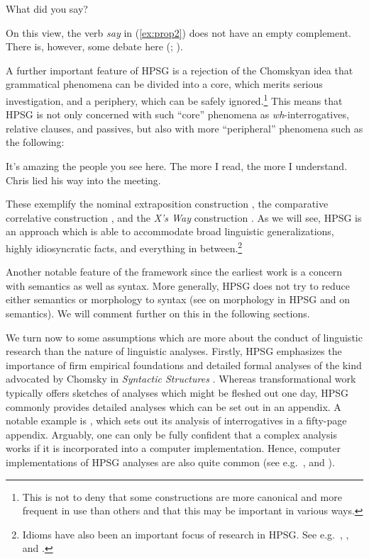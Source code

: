 \documentclass[output=paper
	        ,collection
	        ,collectionchapter
 	        ,biblatex
                ,babelshorthands
                ,newtxmath
                ,draftmode
                ,colorlinks, citecolor=brown
]{langscibook}
\begin{document}
\ea\label{ex:prop2}
What did you say?
\z

\noindent
On this view, the verb \emph{say} in (\ref{ex:prop2}) does not have an empty complement. There is,
however, some debate here (\citealp{SF94a,Mueller2004e};
).

A further important feature of HPSG is a rejection of the Chomskyan idea that grammatical phenomena can be divided into a core, which merits serious investigation, and a periphery, which can be safely ignored.\footnote{%
  This is not to deny that some constructions are more canonical and more frequent in use than others and that this may be important in various ways.}
%
This means that HPSG is not only concerned with such ``core'' phenomena as \emph{wh}-interrogatives, relative clauses, and passives, but also with more ``peripheral'' phenomena such as the following:


\eal\label{ex:prop3}
\ex\label{ex:prop3a}
It’s amazing the people you see here.
\ex\label{ex:prop3b}
The more I read, the more I understand.
\ex\label{ex:prop3c}
Chris lied his way into the meeting.
\zl

\noindent
These exemplify the nominal extraposition construction \citep{ML96a}, the comparative correlative construction \citep{Abeille2006a,AB2008a-u,Borsley2011a-u}, and the \emph{X’s Way} construction \citep[Section~7.4]{Sag2012a}. As we will see, HPSG is an approach which is able to accommodate broad linguistic generalizations, highly idiosyncratic facts, and everything in between.\footnote{%
  Idioms have also been an important focus of research in HPSG. See e.g.\ , , and .}
%

Another notable feature of the framework since the earliest work is a concern with semantics as well as syntax. More generally, HPSG does not try to reduce either semantics or morphology to syntax (see  on morphology in HPSG and  on semantics). We will comment further on this in the following sections.

We turn now to some assumptions which are more about the conduct of linguistic research than the
nature of linguistic analyses. Firstly, HPSG emphasizes the importance of firm empirical foundations
and detailed formal analyses of the kind advocated by Chomsky in \emph{Syntactic Structures}
\citep[]{Chomsky57a}. Whereas transformational work typically offers sketches of analyses which might be fleshed out one day, HPSG commonly provides detailed analyses which can be set out in an appendix. A notable example is \citet{GSag2000a-u}, which sets out its analysis of  interrogatives in a fifty-page appendix. Arguably, one can only be fully confident that a complex analysis works if it is incorporated into a computer implementation. Hence, computer implementations of HPSG analyses are also quite common (see e.g.\ \citealp{Babel,MuellerCoreGram,Copestake2002a,BDFPS2010a-u,Bender2016}, and ).
\end{document}
